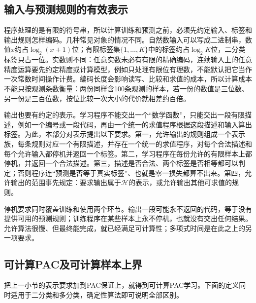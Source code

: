 \subsection{输入与预测规则的有效表示}
\label{sec:effective-representation}

程序处理的是有限的符号串，所以计算训练和预测之前，必须先约定输入、标签和输出规则怎样编码。几种常见对象的情况不同。自然数输入可以写成二进制串，数值$x$约占$\log_2(x+1)$位；有限标签集$\{1,\ldots,K\}$中的标签约占$\log_2K$位，二分类标签只占一位。实数则不同：任意实数未必有有限的精确编码，连续输入上的任意精度运算要先约定精度或计算模型，例如只处理有限位有理数，不能默认把它当作一次常数时间操作计费。编码长度会影响读写、比较和求值的成本，所以计算成本不能只按观测条数衡量：两份同样含100条观测的样本，若一份的数值是三位数、另一份是三百位数，按位比较一次大小的代价就相差约百倍。

输出也要有约定的表示。学习程序不能交出一个“数学函数”，只能交出一段有限描述，例如一个编号或一段代码，再由一个统一的求值程序根据这段描述和输入算出标签。为此，本部分对表示提出以下要求。第一，允许输出的规则组成一个表示族，每条规则对应一个有限描述，并存在一个统一的求值程序，对每个合法描述和每个允许输入都停机并返回一个标签。第二，学习程序在每份允许的有限样本上都停机，并返回一个合法描述。第三，描述是否合法、两个标签是否相等都可以判定；否则程序连“预测是否等于真实标签”、也就是零一损失都算不出来。第四，允许输出的范围事先规定：要求输出属于$\mathcal H$的表示，或允许输出其他可求值的规则。

停机要求同时覆盖训练和使用两个环节。输出一段可能永不返回的代码，等于没有提供可用的预测规则；训练程序在某些样本上永不停机，也就没有交出任何结果。允许算法很慢、但最终能完成，就已经满足可计算性；多项式时间是在此之上的另一项要求。

\subsection{可计算PAC及可计算样本上界}
\label{sec:computable-pac-definition}

把上一小节的表示要求加到PAC保证上，就得到可计算PAC学习。下面的定义同时适用于二分类和多分类，确定性算法即可说明全部区别。

